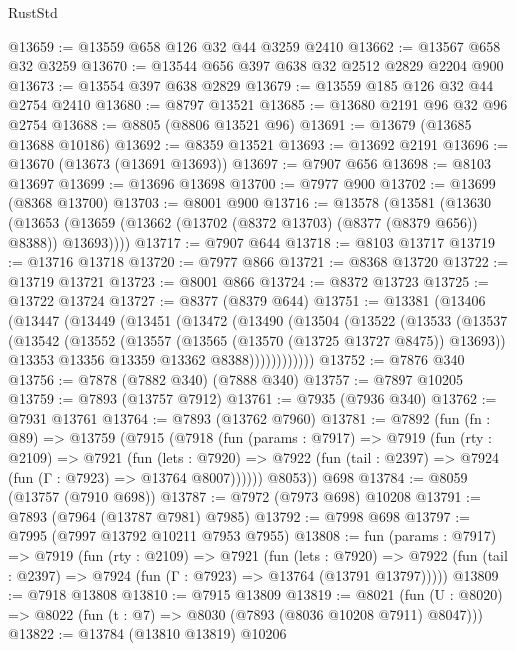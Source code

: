 \begin{lexlean}{RustStd}
\begin{coremodule}
{\begin{coremodule}
{{{{{{{{{{{{{{{{{{{{{{{{{{{{{{{{{{{{{{{{{{{{{{{{{{@13659 := @13559 @658 @126 @32 @44 @3259 @2410
@13662 := @13567 @658 @32 @3259
@13670 := @13544 @656 @397 @638 @32 @2512 @2829 @2204 @900
@13673 := @13554 @397 @638 @2829
@13679 := @13559 @185 @126 @32 @44 @2754 @2410
@13680 := @8797 @13521
@13685 := @13680 @2191 @96 @32 @96 @2754
@13688 := @8805 (@8806 @13521 @96)
@13691 := @13679 (@13685 @13688 @10186)
@13692 := @8359 @13521
@13693 := @13692 @2191
@13696 := @13670 (@13673 (@13691 @13693))
@13697 := @7907 @656
@13698 := @8103 @13697
@13699 := @13696 @13698
@13700 := @7977 @900
@13702 := @13699 (@8368 @13700)
@13703 := @8001 @900
@13716 := @13578
    (@13581
      (@13630 (@13653 (@13659 (@13662 (@13702 (@8372 @13703) (@8377 (@8379 @656)) @8388)) @13693))))
@13717 := @7907 @644
@13718 := @8103 @13717
@13719 := @13716 @13718
@13720 := @7977 @866
@13721 := @8368 @13720
@13722 := @13719 @13721
@13723 := @8001 @866
@13724 := @8372 @13723
@13725 := @13722 @13724
@13727 := @8377 (@8379 @644)
@13751 := @13381
    (@13406
      (@13447
        (@13449
          (@13451
            (@13472
              (@13490
                (@13504
                  (@13522
                    (@13533
                      (@13537
                        (@13542
                          (@13552
                            (@13557 (@13565 (@13570 (@13725 @13727 @8475)) @13693))
                            @13353
                            @13356
                            @13359
                            @13362
                            @8388))))))))))))
@13752 := @7876 @340
@13756 := @7878 (@7882 @340) (@7888 @340)
@13757 := @7897 @10205
@13759 := @7893 (@13757 @7912)
@13761 := @7935 (@7936 @340)
@13762 := @7931 @13761
@13764 := @7893 (@13762 @7960)
@13781 := @7892
    (fun (fn : @89) =>
    @13759
      (@7915
        (@7918
          (fun (params : @7917) =>
          @7919
            (fun (rty : @2109) =>
            @7921
              (fun (lets : @7920) =>
              @7922 (fun (tail : @2397) => @7924 (fun (Γ : @7923) => @13764 @8007))))))
        @8053))
    @698
@13784 := @8059 (@13757 (@7910 @698))
@13787 := @7972 (@7973 @698) @10208
@13791 := @7893 (@7964 (@13787 @7981) @7985)
@13792 := @7998 @698
@13797 := @7995 (@7997 @13792 @10211 @7953 @7955)
@13808 := fun (params : @7917) =>
  @7919
    (fun (rty : @2109) =>
    @7921
      (fun (lets : @7920) =>
      @7922 (fun (tail : @2397) => @7924 (fun (Γ : @7923) => @13764 (@13791 @13797)))))
@13809 := @7918 @13808
@13810 := @7915 @13809
@13819 := @8021
    (fun (U : @8020) => @8022 (fun (t : @7) => @8030 (@7893 (@8036 @10208 @7911) @8047)))
@13822 := @13784 (@13810 @13819) @10206
}}}}}}}}}}}}}}}}}}}}}}}}}}}}}}}}}}}}}}}}}}}}}}}}}}
\end{coremodule}}
\end{coremodule}
\end{lexlean}
